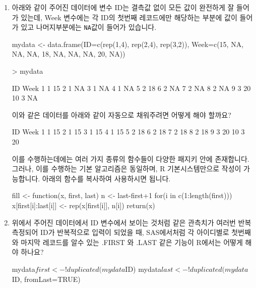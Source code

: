 \documentclass{article}
\begin{document}
\begin{enumerate}
\item 아래와 같이 주어진 데이터에 변수 ID는 결측값 없이 모든 값이 완전하게 잘 들어가 있는데, Week 변수에는 각 ID의 첫번째 레코드에만 해당하는 부분에 값이 들어가 있고 나머지부분에는 \texttt{NA}값이 들어가 있습니다. 

\begin{Schunk}
\begin{Soutput}
mydata <- data.frame(ID=c(rep(1,4), rep(2,4), rep(3,2)), Week=c(15, NA, NA, NA, 18, NA, NA, NA, 20, NA))

> mydata		

   ID Week
1   1   15
2   1   NA
3   1   NA
4   1   NA
5   2   18
6   2   NA
7   2   NA
8   2   NA
9   3   20
10  3   NA
\end{Soutput}
\end{Schunk}

이와 같은 데이터를 아래와 같이 자동으로 채워주려면 어떻게 해야 할까요? 	
	
\begin{Schunk}
\begin{Soutput}
   ID Week
1   1   15
2   1   15
3   1   15
4   1   15
5   2   18
6   2   18
7   2   18
8   2   18
9   3   20
10  3   20
\end{Soutput}
\end{Schunk}
	

이를 수행하는데에는 여러 가지 종류의 함수들이 다양한 패지키 안에 존재합니다.  
그러나, 이를 수행하는 기본 알고리즘은 동일하며, R 기본시스템만으로 작성이 가능합니다. 
아래의 함수를 복사하여 사용하시면 됩니다. 

\begin{Schunk}
	\begin{Soutput}
fill <- function(x, first, last){
	n <- last-first+1
	for(i in c(1:length(first))) x[first[i]:last[i]] <- rep(x[first[i]], n[i])
	return(x)
}
	\end{Soutput}
\end{Schunk}


\item 위에서 주어진 데이터에서 ID 변수에서 보이는 것처럼 같은 관측치가 여러번 반복 측정되어 ID가 반복적으로 입력이 되었을 때, SAS에서처럼 각 아이디별로 첫번째와 마지막 레코드를 알수 있는 .FIRST 와 .LAST 같은 기능이 R에서는 어떻게 해야 하나요?

\begin{Schunk}
\begin{Soutput}
mydata$first <- !duplicated(mydata$ID)
mydata$last <- !duplicated(mydata$ID, fromLast=TRUE)		


\end{Soutput}
\end{Schunk}
\end{enumerate}
\end{document}
